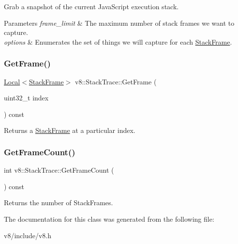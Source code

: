 Grab a snapshot of the current Java\+Script execution stack.


\begin{DoxyParams}{Parameters}
{\em frame\+\_\+limit} & The maximum number of stack frames we want to capture. \\
\hline
{\em options} & Enumerates the set of things we will capture for each \mbox{\hyperlink{classv8_1_1StackFrame}{Stack\+Frame}}. \\
\hline
\end{DoxyParams}
\mbox{\label{classv8_1_1StackTrace_af9f956d39bbfbd7770ae2ab7d6608c0d}} 
\subsubsection{\texorpdfstring{Get\+Frame()}{GetFrame()}}
{\footnotesize\ttfamily \mbox{\hyperlink{classv8_1_1Local}{Local}}$<$\mbox{\hyperlink{classv8_1_1StackFrame}{Stack\+Frame}}$>$ v8\+::\+Stack\+Trace\+::\+Get\+Frame (\begin{DoxyParamCaption}\item[{uint32\+\_\+t}]{index }\end{DoxyParamCaption}) const}

Returns a \mbox{\hyperlink{classv8_1_1StackFrame}{Stack\+Frame}} at a particular index. \mbox{\label{classv8_1_1StackTrace_a97a2010fa998f963df290062a8157849}} 
\subsubsection{\texorpdfstring{Get\+Frame\+Count()}{GetFrameCount()}}
{\footnotesize\ttfamily int v8\+::\+Stack\+Trace\+::\+Get\+Frame\+Count (\begin{DoxyParamCaption}{ }\end{DoxyParamCaption}) const}

Returns the number of Stack\+Frames. 

The documentation for this class was generated from the following file\+:\begin{DoxyCompactItemize}
\item 
v8/include/v8.\+h\end{DoxyCompactItemize}
